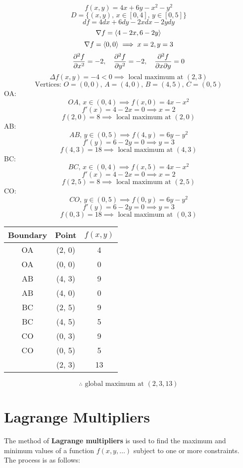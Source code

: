 \[
    f(x, y) = 4x + 6y - x^2 - y^2
\]
\[ 
    D = \{ (x, y), \, x \in [0, 4], \, y \in [0, 5]\}
\]
\[
df = 4dx + 6dy - 2xdx - 2ydy
\]
\[
    \nabla f = \langle 4-2x, 6-2y \rangle
\]
\[
    \nabla f = \langle 0, 0 \rangle \implies x = 2, y = 3
\]
\[  
    \dfrac{\partial^{2} f}{\partial x^{2}} = -2, \quad \dfrac{\partial^{2} f}{\partial y^{2}} = -2, \quad \dfrac{\partial^2 f}{\partial x \partial y} = 0
\]
\[
    \Delta f(x, y) = -4 < 0 \implies \text{ local maximum at } (2, 3)
\]
\[
\text{Vertices: } O = (0, 0), \, A = (4, 0), \, B = (4, 5), \, C = (0, 5)
\]
OA: 
\[
    OA, \, x \in (0, 4) \implies f(x, 0) = 4x - x^2
\]
\[
    f'(x) = 4 - 2x = 0 \implies x = 2
\]
\[
    f(2, 0) = 8 \implies \text{ local maximum at } (2, 0)
\]
AB:
\[
    AB, \, y \in (0, 5) \implies f(4, y) = 6y - y^2
\]
\[
    f'(y) = 6 - 2y = 0 \implies y = 3
\]
\[
    f(4, 3) = 18 \implies \text{ local maximum at } (4, 3)
\]
BC:
\[
    BC, \, x \in (0, 4) \implies f(x, 5) = 4x - x^2
\]
\[
    f'(x) = 4 - 2x = 0 \implies x = 2
\]
\[
    f(2, 5) = 8 \implies \text{ local maximum at } (2, 5)
\]
CO:
\[
    CO, \, y \in (0, 5) \implies f(0, y) = 6y - y^2
\]
\[
    f'(y) = 6 - 2y = 0 \implies y = 3
\]
\[
    f(0, 3) = 18 \implies \text{ local maximum at } (0, 3)
\]
\begin{center}
    \begin{tabular}{|c|c|c|}
        \hline
        Boundary & Point & $f(x, y)$ \\
        \hline
        OA & (2, 0) & 4 \\
        OA & (0, 0) & 0 \\
        AB & (4, 3) & 9 \\
        AB & (4, 0) & 0 \\
        BC & (2, 5) & 9 \\
        BC & (4, 5) & 5 \\
        CO & (0, 3) & 9 \\
        CO & (0, 5) & 5 \\
           & (2, 3) & 13 \\
        \hline
    \end{tabular}
\end{center}
\[
    \therefore \text{ global maximum at } (2, 3, 13)
\]

\section{Lagrange Multipliers}

The method of \textbf{Lagrange multipliers} is used to find the maximum and minimum values of a function \( f(x, y, \dots) \) subject to one or more constraints. The process is as follows:

